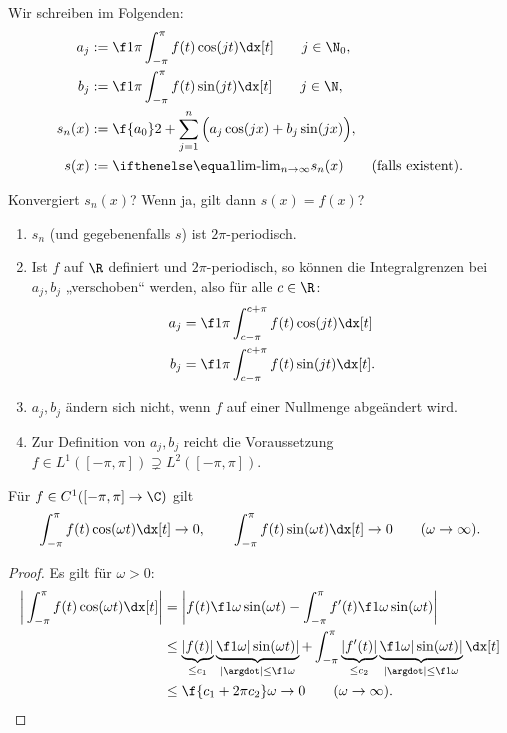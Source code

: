 \begin{nt}[Notation] \label{3.21}
	Wir schreiben im Folgenden:
	\begin{align*}
		a_j &:= \f 1{\pi} \int_{-\pi}^{\pi} f(t) \cos(jt) \dx[t] \qquad j\in \N_0, \\
		b_j &:= \f 1{\pi} \int_{-\pi}^{\pi} f(t) \sin(jt) \dx[t] \qquad j\in \N, \\
		s_n(x) &:= \f {a_0}2 + \sum_{j=1}^n \Big( a_j \cos(jx) + b_j \sin(jx) \Big), \\
		s(x) &:= \lim_{n\to \infty} s_n(x) \qquad \text{(falls existent)}.
	\end{align*}
\end{nt}

Konvergiert $s_n(x)$? Wenn ja, gilt dann $s(x) = f(x)$?

\begin{nt}[Beobachtungen] \label{3.22}
	\begin{enumerate}[1)]
		\item
			$s_n$ (und gegebenenfalls $s$) ist $2\pi$-periodisch.
		\item
			Ist $f$ auf $\R$ definiert und $2\pi$-periodisch, so können die Integralgrenzen bei $a_j, b_j$ „verschoben“ werden, also für alle $c \in \R$:
			\begin{align*}
				a_j &= \f 1{\pi} \int_{c-\pi}^{c+\pi} f(t) \cos(jt) \dx[t] \\
				b_j &= \f 1{\pi} \int_{c-\pi}^{c+\pi} f(t) \sin(jt) \dx[t].
			\end{align*}
		\item
			$a_j, b_j$ ändern sich nicht, wenn $f$ auf einer Nullmenge abgeändert wird.
		\item
			Zur Definition von $a_j, b_j$ reicht die Voraussetzung $f \in L^1([-\pi, \pi]) \supsetneq L^2([-\pi, \pi])$.
	\end{enumerate}
\end{nt}

\begin{lem} \label{3.23}
	Für $f \in C^1([-\pi, \pi] \to \C)$ gilt
	\[
		\int_{-\pi}^{\pi} f(t) \cos(\omega t) \dx[t] \to 0, \qquad
		\int_{-\pi}^{\pi} f(t) \sin(\omega t) \dx[t] \to 0 \qquad (\omega \to \infty).
	\]
	\begin{proof}
		Es gilt für $\omega > 0$:
		\begin{align*}
			\bigg| \int_{-\pi}^{\pi} f(t) \cos(\omega t) \dx[t] \bigg|
			&= \bigg| f(t) \f 1{\omega} \sin(\omega t) - \int_{-\pi}^{\pi} f'(t) \f 1{\omega} \sin(\omega t) \bigg| \\
			&\le \underbrace{|f(t)|}_{\le c_1} \underbrace{\f 1{\omega} |\sin(\omega t)|}_{|\argdot| \le \f 1{\omega}} + \int_{-\pi}^{\pi} \underbrace{|f'(t)|}_{\le c_2} \underbrace{\f 1{\omega} |\sin(\omega t)|}_{|\argdot|\le \f 1{\omega}} \dx[t] \\
			&\le \f {c_1 + 2\pi c_2}\omega \to 0 \qquad (\omega \to \infty).
		\end{align*}
	\end{proof}
\end{lem}

